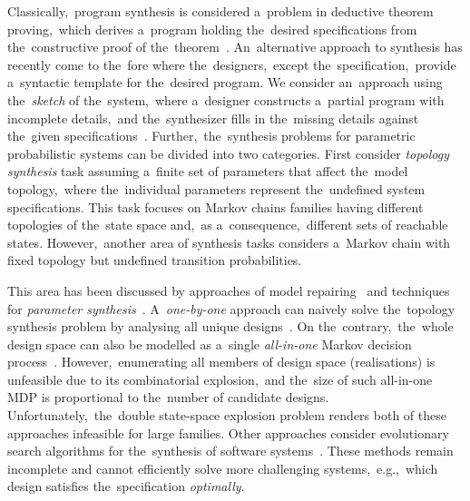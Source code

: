 
Classically,~program synthesis is considered a~problem in deductive theorem proving,~whi\-ch derives a~program holding the~desired specifications from the~constructive proof of the~theorem~\cite{deductive-synthesis}.
An~alternative approach to synthesis has recently come to the~fore where the~designers,~except the~specification,~provide a~syntactic template for the~desired program.
We consider an~approach using the~\emph{sketch} of the~system,~where a~designer constructs a~partial program with incomplete details,~and the~synthesizer fills in the~missing details against the~given specifications~\cite{sketching1}.
Further,~the~synthesis problems for parametric probabilistic systems can be divided into two categories.
First consider \textit{topology synthesis} task assuming a~finite set of parameters that affect the~model topology,~where the~individual parameters represent the~undefined system specifications.
This task focuses on Markov chains families having different topologies of the~state space and,~as a~consequence,~different sets of reachable states.
However,~another area of synthesis tasks considers a~Markov chain with fixed topology but undefined transition probabilities.

This area has been discussed by approaches of model repairing~\cite{model-repair-usage,pathak-et-al-nfm-2015} and techniques for \textit{parameter synthesis}~\cite{ceska2014robustness,Quatmann2016}.
A~\textit{one-by-one} approach can naively solve the~topology synthesis problem by analysing all unique designs~\cite{profeat,onebyone}.
On the~contrary,~the~whole design space can also be modelled as a~single \textit{all-in-one} Markov decision process~\cite{profeat,allinone}.
However,~enumerating all members of design space (realisations) is unfeasible due to its combinatorial explosion,~and the~size of such all-in-one MDP is proportional to the~number of candidate designs.
Unfortunately,~the~double state-space explosion problem renders both of these approaches infeasible for large families.
Other approaches consider evolutionary search algorithms for the~synthesis of software systems~\cite{spl2}.
These methods remain incomplete and cannot efficiently solve more challenging systems,~e.g.,~which design satisfies the~specification \textit{optimally}.

